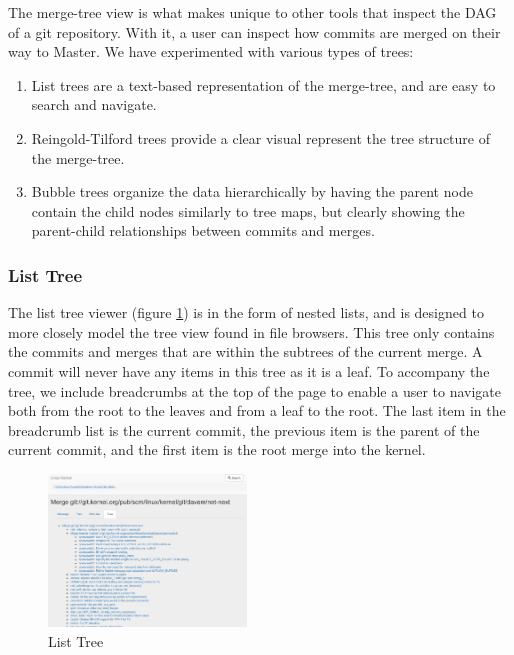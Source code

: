 \documentclass[conference, draftclsnofoot, draft]{IEEEtran}
\begin{document}
The merge-tree view is what makes \tool unique to other tools that inspect the DAG of a git repository. With it, a user can inspect how commits are merged
on their way to Master. We have experimented with various types of trees:

\begin{enumerate}
\item List trees are a text-based representation of the merge-tree, and are easy to search and navigate.
\item Reingold-Tilford trees provide a clear visual represent the tree structure of the merge-tree.
\item Bubble trees organize the data hierarchically by having the parent node contain the child nodes similarly to tree maps, but
clearly showing the parent-child relationships between commits and merges.
\end{enumerate}


\subsubsection{List Tree}

The list tree viewer (figure \ref{fig:list_tree}) is in the form of nested lists,
and is designed to more closely model the tree view found in file browsers. This
tree only contains the commits and merges that are within the subtrees of the
current merge. A commit will never have any items in this tree as it is a leaf. To
accompany the tree, we include breadcrumbs at the top of the page to enable a user
to navigate both from the root to the leaves and from a leaf to the root. The last
item in the breadcrumb list is the current commit, the previous item is the parent
of the current commit, and the first item is the root merge into the kernel.

\begin{figure}
        \centering
        \includegraphics[width=0.47\textwidth]{figures/list_tree.png}
        \caption{List Tree}
        \label{fig:list_tree}
\end{figure}
\end{document}

